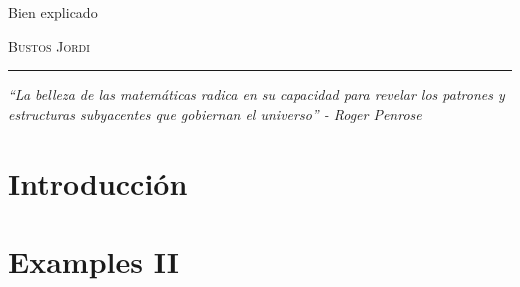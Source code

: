 \documentclass[12pt,a4paper]{book}
\begin{document}
\renewcommand{\contentsname}{\vspace{0cm} Contenido \vspace{-2cm}}

\begin{titlepage}
\vspace*{2cm}

\noindent
\vspace*{0.5cm}

\vspace{1.5cm}
\epigraph{Bien explicado}%
{ \textsc{Bustos Jordi}}
\null\vfill
\vspace*{1cm}
\noindent
\hfill
\begin{minipage}{0.7\linewidth}
    \begin{flushright}
        \printauthor
    \end{flushright}
\end{minipage}
%
\begin{minipage}{0.02\linewidth}
    \rule{1pt}{70pt}
\end{minipage}
\titlepagedecoration
\end{titlepage}

\let\cleardoublepage=\clearpage
\tableofcontents

{\newpage \vspace*{5cm}\thispagestyle{empty}\centering \textit{``La belleza de las matemáticas radica en su capacidad para revelar los patrones y estructuras subyacentes que gobiernan el universo'' - Roger Penrose} \par}
\vspace{\fill}

\chapter{Introducción}

\newpage\thispagestyle{empty}\blankpage

\chapter{Examples II}

\newpage\thispagestyle{empty}\blankpage


\blankpage


\nocite{*}
\end{document}
